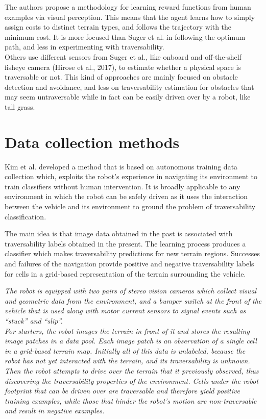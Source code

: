 \documentclass[12pt,a4paper]{report}
\newcommand{\example}{\enquote}
\begin{document}
	The authors propose a methodology for learning reward functions from 
	human examples via visual perception. This means that the agent learns 
	how to simply assign costs to distinct terrain types, and follows the 
	trajectory with the minimum cost. It is more focused than Suger et al. in 
	following the optimum path, and less in experimenting with traversability.
	\\
	
	Others use different sensors from Suger et al., like onboard and off-the-shelf 
	fisheye camera \cite{Hirose} (Hirose et al., 2017), to estimate whether a physical space 
	is traversable or not. This kind of approaches are mainly focused on obstacle 
	detection and avoidance, and less on traversability estimation for obstacles 
	that may seem untraversable while in fact can be easily driven over by a 
	robot, like tall grass.
	\\
	
	\section{Data collection methods}
	\label{sec:bg:data}
	
	Kim et al. \cite{Kim} developed a method 
	that is based on autonomous training data collection which, exploits the 
	robot’s experience in navigating its environment to train classifiers without 
	human intervention. It is broadly applicable to any environment in which 
	the robot can be safely driven as it uses the interaction between the vehicle
	and its environment to ground the problem of traversability classification.
	
	The main idea is that image data  obtained in the past is associated with 
	traversability labels obtained in the  present. The learning process produces a 
	classifier which makes traversability  predictions for new terrain regions. 
	Successes and failures of the navigation provide positive and negative 
	traversability labels for cells in a grid-based representation of the terrain surrounding 
	the vehicle.
	
	\textit{The robot is equipped with two pairs of stereo vision cameras which 
	collect visual and geometric data from the environment, and a bumper switch
	at the front of the vehicle that is used along with motor current sensors to 
	signal events such as \example{stuck} and \example{slip}.
	\\
	For starters, the robot images the terrain in front of it and stores the 
	resulting image patches in a data pool. Each image patch is an observation 
	of a single cell in a grid-based terrain map. Initially all of this data is 
	unlabeled, because the robot has not yet interacted with the terrain, and its 
	traversability is unknown. 
	\\
	Then the robot attempts to drive over the terrain that it previously 
	observed, thus discovering the traversability properties of the environment. 
	Cells under the robot footprint that can be driven over are traversable and 
	therefore yield positive training examples, while those that hinder the robot’s 
	motion are non-traversable	and result in negative examples.}
	
\end{document}
